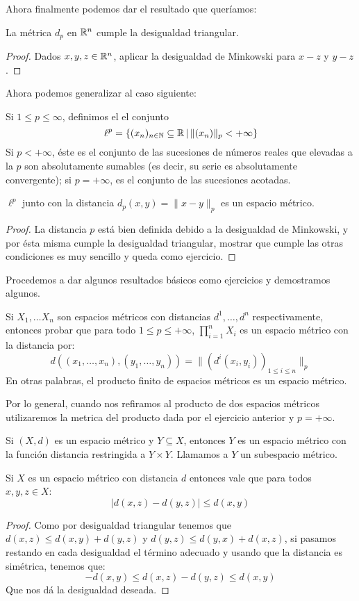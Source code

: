 \documentclass[12pt,a4paper]{book}
\begin{document}
Ahora finalmente podemos dar el resultado que queríamos:
\begin{cor} La métrica $d_p$ en $\mathbb{R}^n$ cumple la desigualdad triangular.
\begin{proof} Dados $x,y,z \in \mathbb{R}^n$, aplicar la desigualdad de Minkowski para $x-z$ y $y-z$.\end{proof}\end{cor}
Ahora podemos generalizar al caso siguiente:
\begin{defi} Si $1 \leq p \leq \infty$, definimos el el conjunto 
$$ \ell^p = \{ (x_n)_{{{n} \in \mathbb{N}}} \subseteq \mathbb{R} \,\vert\, \|(x_n)\|_p < +\infty\}$$
Si $p < +\infty$, éste es el conjunto de las sucesiones de números reales que elevadas a la $p$ son absolutamente sumables (es decir, su serie es absolutamente convergente); si $p = +\infty$, es el conjunto de las sucesiones acotadas. 
\end{defi}
\begin{prop}$\ell^p$ junto con la distancia $d_p(x,y) = \| x - y \|_p$ es un espacio métrico.
\begin{proof} La distancia $p$ está bien definida debido a la desigualdad de Minkowski, y por ésta misma cumple la desigualdad triangular, mostrar que cumple las otras condiciones es muy sencillo y queda como ejercicio.
\end{proof}
\end{prop}
Procedemos a dar algunos resultados básicos como ejercicios y demostramos algunos.
\begin{ej} Si $ X_1, \ldots X_n$ son espacios métricos con distancias $d^1, \ldots, d^n$ respectivamente, entonces probar que para todo $1 \leq p \leq +\infty$, $\prod_{i=1}^n X_i$ es un espacio métrico con la distancia por:
$$ d((x_1,\ldots, x_n), (y_1, \ldots, y_n)) = \| (d^i(x_i,y_i))_{1 \leq i \leq n} \|_p$$
En otras palabras, el producto finito de espacios métricos es un espacio métrico.\end{ej}
Por lo general, cuando nos refiramos al producto de dos espacios métricos utilizaremos la metrica del producto dada por el ejercicio anterior y $p = +\infty$.
\begin{ej} Si $(X,d)$ es un espacio métrico y $Y \subseteq X$, entonces $Y$ es un espacio métrico con la función distancia restringida a $Y \times Y$. Llamamos a $Y$ un subespacio métrico.\end{ej}
\begin{prop} Si $X$ es un espacio métrico con distancia $d$ entonces vale que para todos $x,y,z \in X$:
$$ |d(x,z) - d(y,z)| \leq d(x,y)$$
\begin{proof}
Como por desigualdad triangular tenemos que $ d(x,z) \leq d(x,y) + d(y,z)$ y $d(y,z) \leq d(y,x) + d(x,z)$, si pasamos restando en cada desigualdad el término adecuado y usando que la distancia es simétrica, tenemos que:
$$ - d(x,y) \leq d(x,z) - d(y,z) \leq d(x,y)$$
Que nos dá la desigualdad deseada.
\end{proof}
\end{prop}
\end{document}
